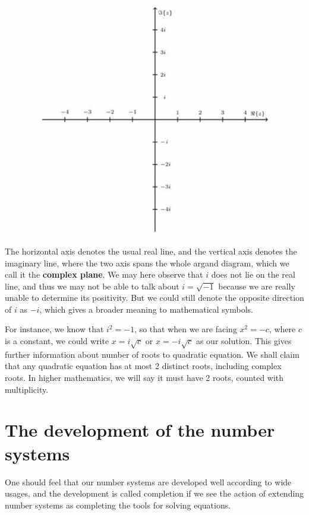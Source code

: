 \documentclass[12pt]{article}
\begin{document}
    \begin{figure}[H]
        \centering
        \includegraphics[scale=0.8]{argand.jpg}
    \end{figure}

    The horizontal axis denotes the usual real line, and the vertical axis denotes the imaginary line, where the two axis spans the whole argand diagram, which we call it the \textbf{complex plane}. We may here observe that $i$ does not lie on the real line, and thus we may not be able to talk about $i=\sqrt{-1}$ because we are really unable to determine its positivity. But we could still denote the opposite direction of $i$ as $-i$, which gives a broader meaning to mathematical symbols.

    For instance, we know that $i^2=-1$, so that when we are facing $x^2=-c$, where $c$ is a constant, we could write $x=i\sqrt{c}$ or $x=-i\sqrt{c}$ as our solution. This gives further information about number of roots to quadratic equation. We shall claim that any quadratic equation has at most 2 distinct roots, including complex roots. In higher mathematics, we will say it must have 2 roots, counted with multiplicity.

    \section*{The development of the number systems}
    One should feel that our number systems are developed well according to wide usages, and the development is called completion if we see the action of extending number systems as completing the tools for solving equations.
\end{document}
